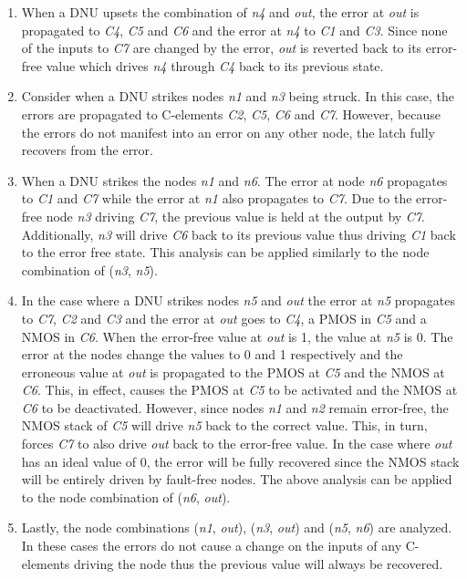 \begin{enumerate}
	\item When a DNU upsets the combination of \textit{n4} and \textit{out}, the error at \textit{out} is propagated to \textit{C4}, \textit{C5} and \textit{C6} and the error at \textit{n4} to \textit{C1} and \textit{C3}. Since none of the inputs to \textit{C7} are changed by the error, \textit{out} is reverted back to its error-free value which drives \textit{n4} through \textit{C4} back to its previous state.
	
	\item Consider when a DNU strikes nodes \textit{n1} and \textit{n3} being struck. In this case, the errors are propagated to C-elements \textit{C2}, \textit{C5}, \textit{C6} and \textit{C7}. However, because the errors do not manifest into an error on any other node, the latch fully recovers from the error. 
	
	\item When a DNU strikes the nodes \textit{n1} and \textit{n6}. The error at node \textit{n6} propagates to  \textit{C1} and \textit{C7} while the error at \textit{n1} also propagates to \textit{C7}. Due to the error-free node \textit{n3} driving \textit{C7}, the previous value is held at the output by \textit{C7}. Additionally, \textit{n3} will drive \textit{C6} back to its previous value thus driving \textit{C1} back to the error free state. This analysis can be applied similarly to the node combination of (\textit{n3}, \textit{n5}). 
	
	\item In the case where a DNU strikes nodes \textit{n5} and \textit{out} the error at \textit{n5} propagates to \textit{C7}, \textit{C2} and \textit{C3} and the error at \textit{out} goes to \textit{C4}, a PMOS in \textit{C5} and a NMOS in \textit{C6}. When the error-free value at \textit{out} is 1, the value at \textit{n5} is 0. The error at the nodes change the values to 0 and 1 respectively and the erroneous value at \textit{out} is propagated to the PMOS at \textit{C5} and the NMOS at \textit{C6}. This, in effect, causes the PMOS at \textit{C5} to be activated and the NMOS at \textit{C6} to be deactivated. However, since nodes \textit{n1} and \textit{n2} remain error-free, the NMOS stack of \textit{C5} will drive \textit{n5} back to the correct value. This, in turn, forces \textit{C7} to also drive \textit{out} back to the error-free value. In the case where \textit{out} has an ideal value of 0, the error will be fully recovered since the NMOS stack will be entirely driven by fault-free nodes. The above analysis can be applied to the node combination of (\textit{n6}, \textit{out}). 
	
	\item Lastly, the node combinations (\textit{n1}, \textit{out}), (\textit{n3}, \textit{out}) and (\textit{n5}, \textit{n6}) are analyzed. In these cases the errors do not cause a change on the inputs of any C-elements driving the node thus the previous value will always be recovered. 
\end{enumerate}

